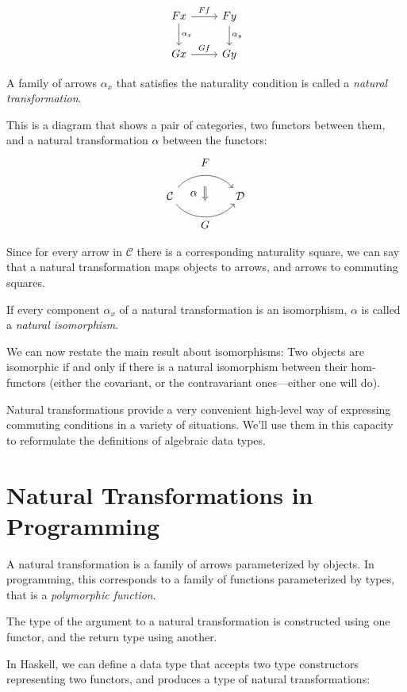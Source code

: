 \documentclass[DaoFP]{subfiles}
\begin{document}
\[
 \begin{tikzcd}
 F x
 \arrow[d, "\alpha_x"]
 \arrow[r, "F f"]
 &
F y
  \arrow[d, "\alpha_y"]
 \\
G x
 \arrow[r, "G f"]
& G y
 \end{tikzcd}
\]

A family of arrows $\alpha_x$ that satisfies the naturality condition is called a \emph{natural transformation}.

This is a diagram that shows a pair of categories, two functors between them, and a natural transformation $\alpha$ between the functors:
\[
\begin{tikzcd}[column sep=huge]
\mathcal{C}
  \arrow[bend left=50]{r}[name=U, label=above:$F$]{}
  \arrow[bend right=50]{r}[name=D, label=below:$G$]{} 
 &
\mathcal{D}
  \arrow[shorten <=10pt,shorten >=10pt,Rightarrow,to path={(U) -- node[label=left:$\alpha$] {} (D)}]{}
\end{tikzcd}
\]


Since for every arrow in $\mathcal{C}$ there is a corresponding naturality square, we can say that a natural transformation maps objects to arrows, and arrows to commuting squares.

If every component $\alpha_x$ of a natural transformation is an isomorphism, $\alpha$ is called a \emph{natural isomorphism}. 

We can now restate the main result about isomorphisms: Two objects are isomorphic if and only if there is a natural isomorphism between their hom-functors (either the covariant, or the contravariant ones---either one will do).

Natural transformations provide a very convenient high-level way of expressing commuting conditions in a variety of situations. We'll use them in this capacity to reformulate the definitions of algebraic data types.

\section{Natural Transformations in Programming}

A natural transformation is a family of arrows parameterized by objects. In programming, this corresponds to a family of functions parameterized by types, that is a \emph{polymorphic function}. 

The type of the argument to a natural transformation is constructed using one functor, and the return type using another. 

In Haskell, we can define a data type that accepts two type constructors representing two functors, and produces a type of natural transformations:
\end{document}
